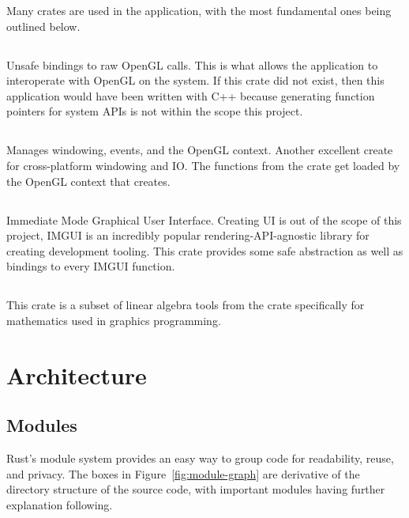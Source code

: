 Many crates are used in the application, with the most fundamental ones being outlined below.

\subsection{}
Unsafe bindings to raw OpenGL calls.
This is what allows the application to interoperate with OpenGL on the system.
If this crate did not exist, then this application would have been written with C++ because generating function pointers for system APIs is not within the scope this project.

\subsection{}
Manages windowing, events, and the OpenGL context.
Another excellent create for cross-platform windowing and IO\@.
The functions from the  crate get loaded by the OpenGL context that  creates.

\subsection{}
Immediate Mode Graphical User Interface.
Creating UI is out of the scope of this project, IMGUI is an incredibly popular rendering-API-agnostic library for creating development tooling.
This crate provides some safe abstraction as well as bindings to every IMGUI function.

\subsection{}
This crate is a subset of linear algebra tools from the  crate specifically for mathematics used in graphics programming.

\section{Architecture}\label{sec:architecture}

\subsection{Modules}
Rust's module system provides an easy way to group code for readability, reuse, and privacy.
The boxes in Figure~\ref{fig:module-graph} are derivative of the directory structure of the source code, with important modules having further explanation following.


